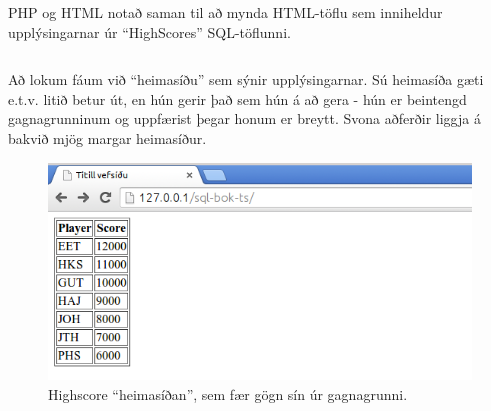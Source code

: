 \begin{example}
\caption[PHP + HTML]{PHP og HTML notað saman til að mynda HTML-töflu sem inniheldur upplýsingarnar úr ``HighScores'' SQL-töflunni.}
\label{php:index}
\centering
\inputminted[frame=lines, fontfamily=courier]{html}{php/index.html.php}
\end{example}

Að lokum fáum við ``heimasíðu'' sem sýnir upplýsingarnar. Sú heimasíða gæti e.t.v. litið betur út, en hún gerir það sem hún á að gera - hún er beintengd gagnagrunninum og uppfærist þegar honum er breytt. Svona aðferðir liggja á bakvið mjög margar heimasíður.

\begin{figure}
\caption[Heimasíðan]{Highscore ``heimasíðan'', sem fær gögn sín úr gagnagrunni.}
\label{mynd:index}
\centering
\includegraphics[width=\linewidth]{myndir/index}
\end{figure}